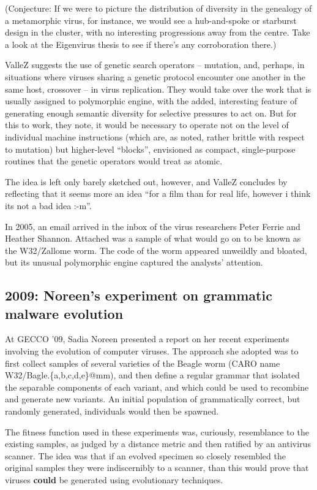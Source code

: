 \documentclass[12pt,glossary]{dalthesis}
\begin{document}
(Conjecture: If we were to picture the distribution of diversity in the
genealogy of a metamorphic virus, for instance, we would see a hub-and-spoke or
starburst design in the cluster, with no interesting progressions away from the
centre. Take a look at the Eigenvirus thesis to see if there's any corroboration
there.)

ValleZ suggests the use of genetic search operators -- mutation, and, perhaps,
in situations where viruses sharing a genetic protocol encounter one another in
the same host, crossover -- in virus replication. They would take over the work
that is usually assigned to polymorphic engine, with the added, interesting
feature of generating enough semantic diversity for selective pressures to act
on. But for this to work, they note, it would be necessary to operate not on the
level of individual machine instructions (which are, as noted, rather brittle
with respect to mutation) but higher-level ``blocks'', envisioned as compact,
single-purpose routines that the genetic operators would treat as atomic.

The idea is left only barely sketched out, however, and ValleZ concludes by
reflecting that it seems more an idea ``for a film than for real life, however i
think its not a bad idea :-m''.


In 2005, an email arrived in the inbox of the virus researchers Peter Ferrie and
Heather Shannon. Attached was a sample of what would go on to be known as the
W32/Zallome worm. The code of the worm appeared unweildly and bloated, but its
unusual polymorphic engine captured the analysts' attention.

\subsection{2009: Noreen's experiment on grammatic malware evolution}
\label{sec:orgf9eb880}

At GECCO '09, Sadia Noreen presented a report on her recent experiments
involving the evolution of computer viruses. The approach she adopted was to
first collect samples of several varieties of the Beagle worm (CARO name
W32/Bagle.\{a,b,c,d,e\}@mm), and then define a regular grammar that isolated the
separable components of each variant, and which could be used to recombine and
generate new variants. An initial population of grammatically correct, but
randomly generated, individuals would then be spawned.

The fitness function used in these experiments was, curiously, resemblance to
the existing samples, as judged by a distance metric and then ratified by an
antivirus scanner. The idea was that if an evolved specimen so closely resembled
the original samples they were indiscernibly to a scanner, than this would prove
that viruses \textbf{could} be generated using evolutionary techniques.
\end{document}
